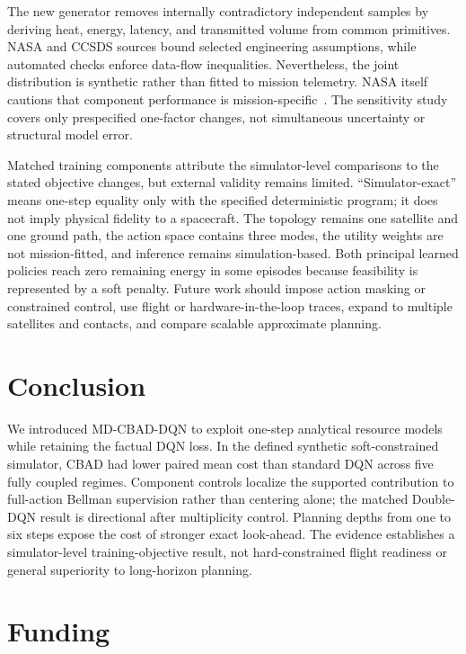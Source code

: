 \documentclass[11pt]{article}
\newcommand{\method}{MD-CBAD-DQN\xspace}
\begin{document}
The new generator removes internally contradictory independent samples by deriving heat, energy, latency, and transmitted volume from common primitives. NASA and CCSDS sources bound selected engineering assumptions, while automated checks enforce data-flow inequalities. Nevertheless, the joint distribution is synthetic rather than fitted to mission telemetry. NASA itself cautions that component performance is mission-specific~\cite{nasa2026soa}. The sensitivity study covers only prespecified one-factor changes, not simultaneous uncertainty or structural model error.

Matched training components attribute the simulator-level comparisons to the stated objective changes, but external validity remains limited. ``Simulator-exact'' means one-step equality only with the specified deterministic program; it does not imply physical fidelity to a spacecraft. The topology remains one satellite and one ground path, the action space contains three modes, the utility weights are not mission-fitted, and inference remains simulation-based. Both principal learned policies reach zero remaining energy in some episodes because feasibility is represented by a soft penalty. Future work should impose action masking or constrained control, use flight or hardware-in-the-loop traces, expand to multiple satellites and contacts, and compare scalable approximate planning.

\section{Conclusion}

We introduced \method to exploit one-step analytical resource models while retaining the factual DQN loss. In the defined synthetic soft-constrained simulator, CBAD had lower paired mean cost than standard DQN across five fully coupled regimes. Component controls localize the supported contribution to full-action Bellman supervision rather than centering alone; the matched Double-DQN result is directional after multiplicity control. Planning depths from one to six steps expose the cost of stronger exact look-ahead. The evidence establishes a simulator-level training-objective result, not hard-constrained flight readiness or general superiority to long-horizon planning.

\section*{Funding}
\end{document}
